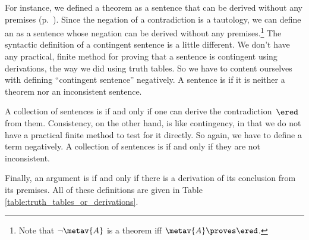 For instance, we defined a theorem as a sentence that can be derived
without any premises (p.~\pageref{def:syntactic_tautology_in_sl}).
Since the negation of a contradiction is a tautology, we can define an
\label{def:syntactic_contradiction_in_sl} as a sentence whose negation
can be derived without any premises.\footnote{Note that $\lnot
\metav{A}$ is a theorem iff $\metav{A} \proves \ered$.} The syntactic
definition of a contingent sentence is a little different. We don't
have any practical, finite method for proving that a sentence is
contingent using derivations, the way we did using truth tables. So we
have to content ourselves with defining ``contingent sentence''
negatively. A sentence is  \label{def:syntactically_contingent_in_sl} if it is neither a
theorem nor an inconsistent sentence.
 

A collection of sentences is  \label{def:syntactically_inconsistent_ in_sl} if and only if one can derive the contradiction~$\ered$ from them. Consistency, on the other hand, is like contingency, in that we do not have a practical finite method to test for it directly. So again, we have to define a term negatively. A collection of sentences is  \label{def:syntactically consistent in SL} if and only if they are not inconsistent.
    

Finally, an argument is  \label{def:syntactically_valid_in_SL} if and only if there is a derivation of its conclusion from its premises. All of these definitions are given in Table \ref{table:truth_tables_or_derivations}.


